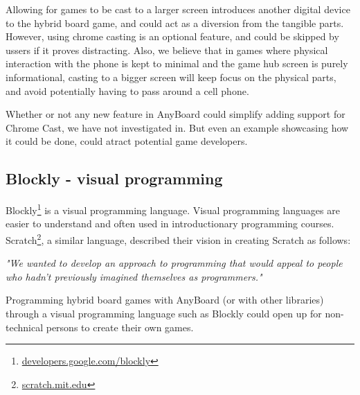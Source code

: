 Allowing for games to be cast to a larger screen introduces another digital device to the hybrid board game, and could act as a diversion from the tangible parts. However, using chrome casting is an optional feature, and could be skipped by ussers if it proves distracting. Also, we believe that in games where physical interaction with the phone is kept to minimal and the game hub screen is purely informational, casting to a bigger screen will keep focus on the physical parts, and avoid potentially having to pass around a cell phone. 

Whether or not any new feature in AnyBoard could simplify adding support for Chrome Cast, we have not investigated in. But even an example showcasing how it could be done, could atract potential game developers.

\subsection{Blockly - visual programming}
Blockly\footnote{\href{https://developers.google.com/blockly/}{developers.google.com/blockly}} is a visual programming language. Visual programming languages are easier to understand and often used in introductionary programming courses. Scratch\footnote{\href{https://scratch.mit.edu/}{scratch.mit.edu}}, a similar language, described their vision in creating Scratch as follows:	

\begin{displayquote}
\emph{"We wanted to develop an approach to programming that would appeal to people who hadn’t
previously imagined themselves as programmers."} \cite{resnick2009scratch}
\end{displayquote}

Programming hybrid board games with AnyBoard (or with other libraries) through a visual programming language such as Blockly could open up for non-technical persons to create their own games. 

\newpage
